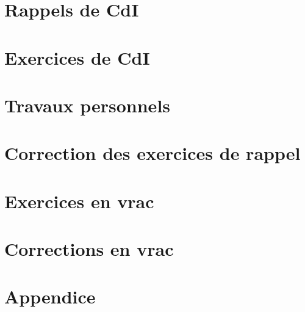 



\chapter{Rappels de CdI}



\chapter{Exercices de CdI}



\chapter{Travaux personnels}


\chapter{Correction des exercices de rappel}


\chapter{Exercices en vrac}



 

\chapter{Corrections en vrac}




\appendix

\chapter{Appendice}
\pagestyle{plain}

\setcounter{section}{0}
\renewcommand{\theequation}{\Alph{section}.\arabic{equation}}
\renewcommand{\thenumtho}{\Alph{section}.\arabic{numtho}}
\renewcommand{\thesection}{\Alph{section}}



